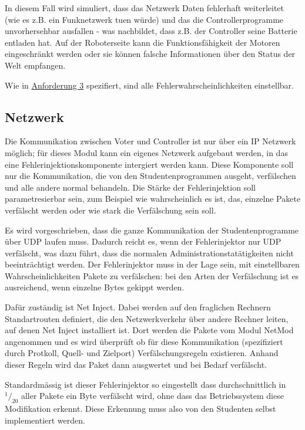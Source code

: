 In diesem Fall wird simuliert, dass das Netzwerk Daten fehlerhaft weiterleitet
(wie es z.B. ein Funknetzwerk tuen w{\"{u}}rde) und das die Controllerprogramme unvorhersehbar
ausfallen - was nachbildet, dass z.B. der Controller seine Batterie entladen hat. Auf der Roboterseite
kann die Funktionsf{\"{a}}higkeit der Motoren eingeschr{\"{a}}nkt werden oder sie k{\"{o}}nnen
falsche Informationen {\"{u}}ber den Status der Welt empfangen.

Wie in \hyperref[anforderung]{Anforderung 3} spezifiert, sind alle Fehlerwahrscheinlichkeiten einstellbar.

\subsection{Netzwerk}
Die Kommunikation zwischen Voter und Controller ist nur {\"{u}}ber ein IP Netzwerk m{\"{o}}glich;
f{\"{u}}r dieses Modul kann ein eigenes Netzwerk aufgebaut werden, in das eine Fehlerinjektionskomponente 
intergiert werden kann. Diese Komponente soll nur die Kommunikation, die von den Studentenprogrammen ausgeht, 
verf{\"{a}}lschen und alle andere normal behandeln. Die St{\"{a}}rke der Fehlerinjektion soll parametresierbar 
sein, zum Beispiel wie wahrscheinlich es ist, das, einzelne Pakete verf{\"{a}}lscht werden oder wie stark
die Verf{\"{a}}lschung sein soll.

Es wird vorgeschrieben, dass die ganze Kommunikation der Studentenprogramme {\"{u}}ber UDP laufen muss. Dadurch reicht es, wenn der Fehlerinjektor nur UDP verf{\"{a}}lscht, was dazu
f{\"{u}}hrt, dass die normalen Administrationstat{\"{a}}tigkeiten nicht beeintr{\"{a}}chtigt werden. Der Fehlerinjektor muss in der Lage sein, mit einstellbaren Wahrscheinlichkeiten
Pakete zu verf{\"{a}}lschen: bei den Arten der Verf{\"{a}}lschung ist es ausreichend, wenn einzelne Bytes gekippt werden.

Daf{\"{u}}r zust{\"{a}}ndig ist Net Inject\cite{kubertzki}. Dabei werden auf den fraglichen Rechnern
Standartrouten definiert, die den Netzwerkverkehr {\"{u}}ber andere Rechner leiten, auf denen Net Inject
installiert ist. Dort werden die Pakete vom Modul NetMod angenommen und es wird {\"{u}}berpr{\"{u}}ft ob
f{\"{u}}r diese Kommunikation (spezifiziert durch Protkoll, Quell- und Zielport) Verf{\"{a}}lschungsregeln
existieren. Anhand dieser Regeln wird das Paket dann ausgwertet und bei Bedarf verf{\"{a}}lscht.

Standardm{\"{a}}ssig ist dieser Fehlerinjektor so eingestellt dass durchschnittlich in $ ^1/_{20} $ aller Pakete ein Byte verf{\"{a}}lscht wird,
ohne dass das Betriebssystem diese Modifikation erkennt. Diese Erkennung muss also von den Studenten selbst implementiert werden.

